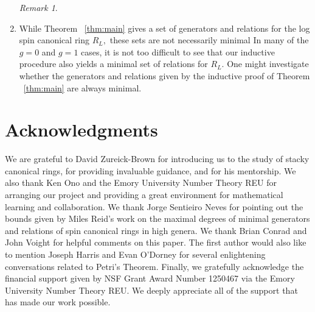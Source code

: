 \documentclass{amsart}
\theoremstyle{plain}
\theoremstyle{definition}
\theoremstyle{remark}
\newtheorem{rem}[thm]{Remark}
\numberwithin{equation}{section}
\newcommand{\halfcan}{L}
\begin{document}
\begin{enumerate}
\begin{rem}
			\end{rem}
	\item While Theorem ~\ref{thm:main} gives a set of 
		generators and relations
		for the log spin canonical ring $R_\halfcan,$ these sets are not necessarily minimal
		In many of the $g = 0$ and $g=1$ cases, 
		it is not too difficult to see that our inductive procedure also 
		yields a minimal set of relations for $R_\halfcan$. One might investigate 
		whether the generators and relations given by the inductive proof 
		of Theorem ~\ref{thm:main} are always minimal.
		\end{enumerate}


\section{Acknowledgments}
We are grateful to David Zureick-Brown for introducing us to the
study of stacky canonical rings, for providing invaluable guidance,
and for his mentorship. We also thank Ken Ono and the
Emory University Number Theory REU for arranging our project and
providing a great environment for mathematical learning and
collaboration. We thank Jorge Sentieiro Neves for pointing out the
bounds given by Miles Reid's work on the maximal degrees of minimal
generators and relations of spin canonical rings in high genera.
We thank Brian Conrad and John Voight for helpful comments on this paper. The first author would also like to mention Joseph Harris and Evan O'Dorney for several enlightening conversations related to Petri's Theorem.
Finally, we gratefully acknowledge the financial support given by
NSF Grant Award Number 1250467 via the Emory University Number
Theory REU. We deeply appreciate all of the support that has made
our work possible.


\nocite{*}
{}

\end{document}
